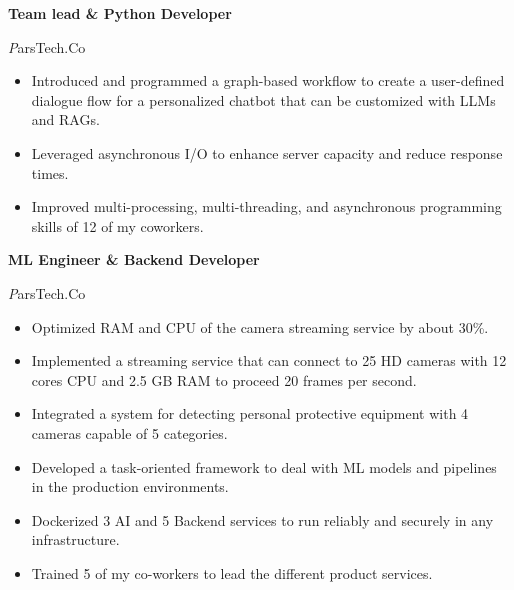 \begin{rubric}{}


\entry*[2023 - present]%
	\textbf{Team lead \& Python Developer} \par {\emph ParsTech.Co}
        \begin{itemize}
          \setlength{\itemsep}{0ex} %
          \setlength{\parskip}{1pt}     %
            \item Introduced and programmed a graph-based workflow to create a user-defined dialogue flow for a personalized chatbot that can be customized with LLMs and RAGs.
            \item Leveraged asynchronous I/O to enhance server capacity and reduce response times.
            \item Improved multi-processing, multi-threading, and asynchronous programming skills of 12 of my coworkers.
        \end{itemize}


\entry*[2021 -- 2023]%
	\textbf{ML Engineer \& Backend Developer} \par {\emph ParsTech.Co}
        \begin{itemize}
          \setlength{\itemsep}{0ex} %
          \setlength{\parskip}{1pt}     %
          \item Optimized RAM and CPU of the camera streaming service by about 30\%.
          \item Implemented a streaming service that can connect to 25 HD cameras with 12 cores CPU and 2.5 GB RAM to proceed 20 frames per second.
          \item Integrated a system for detecting personal protective equipment with 4 cameras capable of 5 categories.
          \item Developed a task-oriented framework to deal with ML models and pipelines in the production environments.
          \item Dockerized 3 AI and 5 Backend services to run reliably and securely in any infrastructure.
          \item Trained 5 of my co-workers to lead the different product services.
        \end{itemize}




\end{rubric}
